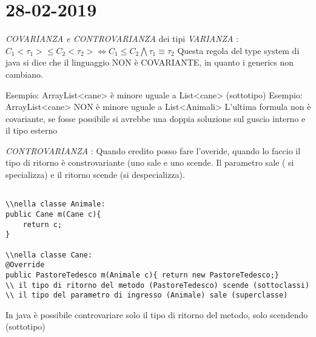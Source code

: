 

\newpage
\section{28-02-2019}
\par

\textit{COVARIANZA e CONTROVARIANZA} dei tipi \newline
\textit{VARIANZA} : \newline
$C_{1} <\tau_{1}> \leq C_{2}<\tau_{2}> \Leftrightarrow C_{1} \leq C_{2} \bigwedge \tau_{1}\equiv \tau_{2} $
Questa regola del type system di java si dice che il linguaggio NON è COVARIANTE, in quanto i generics non cambiano. \newline

Esempio: ArrayList<cane> è minore uguale a List<cane> (sottotipo) \newline
Esempio: ArrayList<cane> NON è minore uguale a List<Animali> \newline
L'ultima formula non è covariante, se fosse possibile si avrebbe una doppia soluzione sul guscio interno e il tipo esterno \newline

\textit{CONTROVARIANZA} : \newline
Quando eredito posso fare l'overide, quando lo faccio il tipo di ritorno è constrovariante (uno sale e uno scende. Il parametro sale ( si specializza) e il ritorno scende (si despecializza). \newline





\begin{lstlisting}[basicstyle=\small,]

\\nella classe Animale:
public Cane m(Cane c){
	return c;
}

\\nella classe Cane:
@Override
public PastoreTedesco m(Animale c){ return new PastoreTedesco;}
\\ il tipo di ritorno del metodo (PastoreTedesco) scende (sottoclassi)
\\ il tipo del parametro di ingresso (Animale) sale (superclasse)

\end{lstlisting}

In java è possibile controvariare solo il tipo di ritorno del metodo, solo scendendo (sottotipo) \newline


